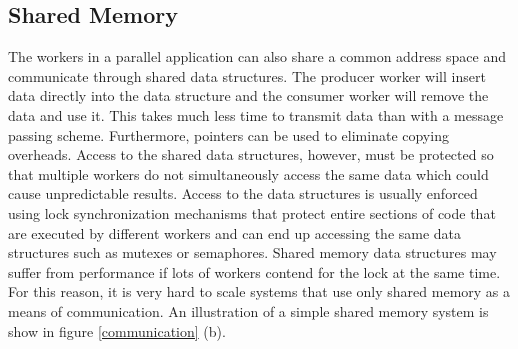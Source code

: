 \documentclass[11pt]{book}
\begin{document}
\subsection{Shared Memory}

The workers in a parallel application can also share a common address space and communicate
through shared data structures.  The producer worker will insert data directly into the data
structure and the consumer worker will remove the data and use it.  This takes much less time
to transmit data than with a message passing scheme.  Furthermore, pointers can be used to
eliminate copying overheads.  Access to the shared data structures, however, must be protected
so that multiple workers do not simultaneously access the same data which could cause unpredictable
results.  Access to the data structures is usually enforced using lock synchronization mechanisms
that protect entire sections of code that are executed by different workers and can end up accessing
the same data structures such as mutexes or semaphores.  Shared memory data structures may suffer
from performance if lots of workers contend for the lock at the same time.  For this reason, it
is very hard to scale systems that use only shared memory as a means of communication.
An illustration of a simple shared memory system is show in figure \ref{communication} (b).
\end{document}
